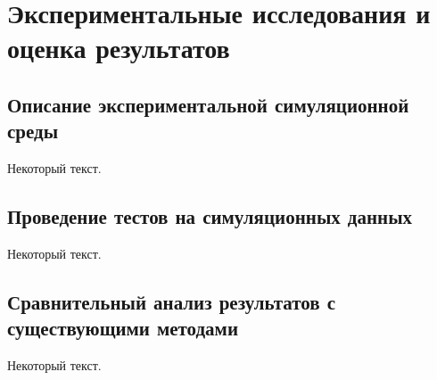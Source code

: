 \chapter{Экспериментальные исследования и оценка результатов}\label{ch:ch4}

\section{Описание экспериментальной симуляционной среды}\label{sec:ch4/sec1}

Некоторый текст.

\section{Проведение тестов на симуляционных данных}\label{sec:ch4/sec2}

Некоторый текст.

\section{Сравнительный анализ результатов с существующими методами}\label{sec:ch4/sec3}

Некоторый текст.

\FloatBarrier